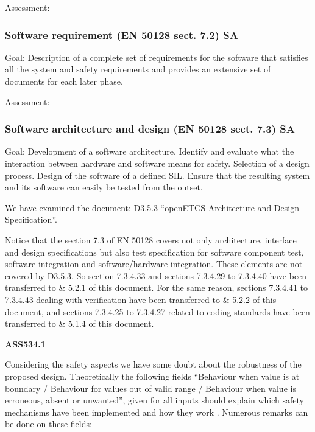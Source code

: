 \bigskip


\bigskip

Assessment:


\bigskip

\subsubsection{Software requirement (EN 50128 sect. 7.2) SA}
Goal: Description of a complete set of requirements for the software that satisfies all the system and safety
requirements and provides an extensive set of documents for each later phase.


\bigskip


\bigskip


\bigskip

Assessment:


\bigskip

\subsubsection{Software architecture and design
(EN 50128 sect. 7.3) SA}
Goal: Development of a software architecture. Identify and evaluate what the interaction between hardware and software
means for safety. Selection of a design process. Design of the software of a defined SIL. Ensure that the resulting
system and its software can easily be tested from the outset.

We have examined the document: D3.5.3 ``openETCS Architecture and Design Specification''.

Notice that the section 7.3 of EN 50128 covers not only architecture, interface and design specifications but also test
specification for software component test, software integration and software/hardware integration. These elements are
not covered by D3.5.3. So section 7.3.4.33 and sections 7.3.4.29 to 7.3.4.40 have been transferred to \& 5.2.1 of this
document. For the same reason, sections 7.3.4.41 to 7.3.4.43 dealing with verification have been transferred to \& 5.2.2
of this document, and sections 7.3.4.25 to 7.3.4.27 related to coding standards have been transferred to \& 5.1.4 of
this document.

{\bfseries
ASS534.1}

Considering the safety aspects we have some doubt about the robustness of the proposed design. Theoretically the
following fields ``Behaviour when value is at boundary / Behaviour for values out of valid range / Behaviour when value
is erroneous, absent or unwanted'', given for all inputs should explain which safety mechanisms have been implemented
and how they work . Numerous remarks can be done on these fields:

